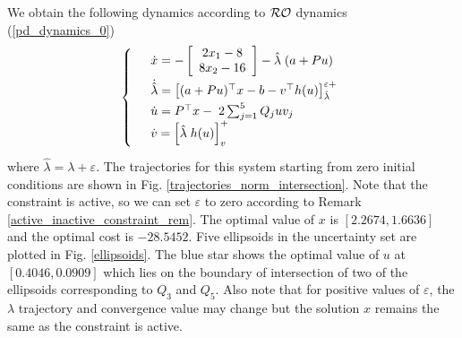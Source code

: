 \documentclass[journal,twoside,web]{ieeecolor}
\begin{document}
We obtain the following dynamics according to ${\cal RO}$ dynamics (\ref{pd_dynamics_0})
\begin{align*}
\left\{
\begin{array}{cl}
\vspace{1mm}
&\dot x=-\left[\begin{array}{ccl} 2x_1-8\\8x_2-16 \end{array}\right]-\hat{\lambda}\;(a+Pu)\\
\vspace{1mm}
&\dot {\hat{\lambda}} = \big[(a+Pu)^\top x-b-v ^\top h(u)\big]_{\hat{\lambda}}^{\varepsilon+}\\
&\dot u=P^\top x-\;2\sum_{j=1}^5 Q_j u v_{j}\\
\vspace{1mm}
&\dot v=\left[\hat{\lambda}\; h(u) \right]_{v}^+
\end{array}
\vspace{1mm}
\right.
\end{align*}
where $\hat{\lambda}=\lambda+\varepsilon$. 
The trajectories for this system starting from zero initial conditions are shown in Fig. \ref{trajectories_norm_intersection}. Note that the constraint is active, so we can set $\varepsilon$ to zero according to Remark \ref{active_inactive_constraint_rem}. The optimal value of $x$ is $[2.2674,1.6636]$ and the optimal cost is $-28.5452$. Five ellipsoids in the uncertainty set are plotted in Fig. \ref{ellipsoids}. The blue star shows the optimal value of $u$ at $[0.4046,0.0909]$ which lies on the boundary of intersection of two of the ellipsoids corresponding to $Q_3$ and $Q_5$.  %
Also note that for positive values of $\varepsilon$, the $\lambda$ trajectory and convergence value may change but the solution $x$ remains the same as the constraint is active.
\end{document}
